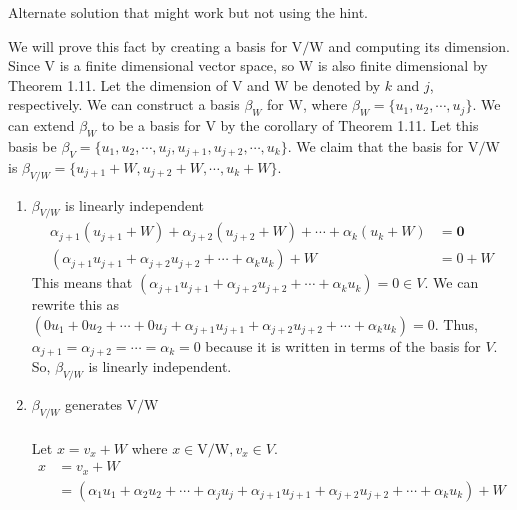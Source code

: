 \documentclass[11pt]{scrartcl}
\begin{document}
\begin{enumerate}[label=\alph*.]
	      \iffalse
		      Alternate solution that might work but not using the hint.

		      We will prove this fact by creating a basis for $\mathrm{V}/\mathrm{W}$ and computing its dimension.
		      Since $\mathrm{V}$ is a finite dimensional vector space, so $\mathrm{W}$ is also finite dimensional by Theorem 1.11.
		      Let the dimension of $\mathrm{V}$ and $\mathrm{W}$ be denoted by $k$ and $j$, respectively.
		      We can construct a basis $\beta_W$ for $\mathrm{W}$, where $\beta_W = \{u_1, u_2, \cdots, u_j\}$.
		      We can extend $\beta_W$ to be a basis for $\mathrm{V}$ by the corollary of Theorem 1.11.
		      Let this basis be $\beta_V = \{u_1, u_2, \cdots, u_j, u_{j+1}, u_{j+2}, \cdots , u_{k}\}$.
		      We claim that the basis for $\mathrm{V}/\mathrm{W}$ is
		      $\beta_{V/W} = \{u_{j+1} + W, u_{j+2} + W, \cdots , u_{k} + W\}$.
		      \begin{enumerate}[label=\roman*.]
			      \item{
			            $\beta_{V/W}$ is linearly independent
			            \begin{align*}
				            \alpha_{j+1}(u_{j+1} + W) + \alpha_{j+2}(u_{j+2} + W) + \cdots + \alpha_{k}(u_{k} + W) & = \mathbf{0} \\
				            (\alpha_{j+1}u_{j+1} + \alpha_{j+2}u_{j+2} + \cdots + \alpha_{k}u_{k}) + W             & = 0 + W
			            \end{align*}
			            This means that $(\alpha_{j+1}u_{j+1} + \alpha_{j+2}u_{j+2} + \cdots + \alpha_{k}u_{k}) = 0 \in V$.
			            We can rewrite this as $(0u_1 + 0u_2 + \cdots + 0u_j + \alpha_{j+1}u_{j+1} + \alpha_{j+2}u_{j+2} + \cdots + \alpha_{k}u_{k}) = 0$.
			            Thus, $ \alpha_{j+1} = \alpha_{j+2} = \cdots = \alpha_{k} = 0$ because it is written in terms
			            of the basis for $V$. So, $\beta_{V/W}$ is linearly independent.
			            }
			      \item{
			            $\beta_{V/W}$ generates $\mathrm{V}/\mathrm{W}$\\\-\\
			            Let $x = v_x + W$ where $x \in \mathrm{V}/\mathrm{W}, v_x \in V$.
			            \begin{align*}
				            x & = v_x + W                                                                                                                            \\
				              & = (\alpha_1u_1 + \alpha_2u_2 + \cdots + \alpha_ju_j + \alpha_{j+1}u_{j+1} + \alpha_{j+2}u_{j+2} + \cdots + \alpha_{k}u_{k}) + W      \\

\end{align*}}
\end{enumerate}
\end{enumerate}
\end{document}
